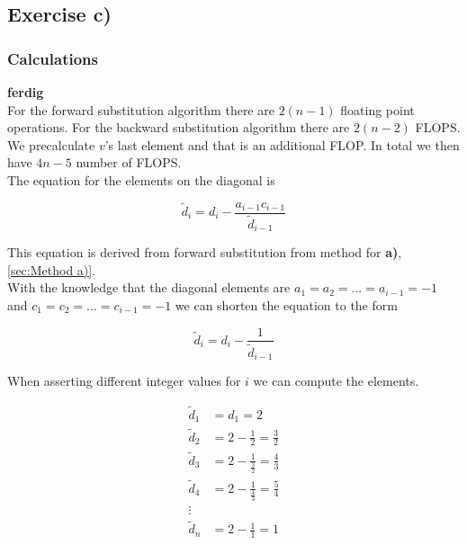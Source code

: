 \documentclass{article}
\begin{document}
\subsection{Exercise c)} \label{sec:Method c)}

  \subsubsection{Calculations}

    {\bf ferdig} \\

    For the forward substitution algorithm there are $2(n-1)$ floating point operations. For the backward substitution algorithm there are $2(n-2)$ FLOPS. We precalculate $v$'s last element and that is an additional FLOP. In total we then have $4n - 5$ number of FLOPS. \\

    The equation for the elements on the diagonal is

    \begin{equation*}
      \tilde{d}_i = d_i - \frac{a_{i-1} c_{i-1}}{\tilde{d}_{i-1}}
    \end{equation*}

    This equation is derived from forward substitution from method for \textbf{a)}, \ref{sec:Method a)}. \\

    With the knowledge that the diagonal elements are $a_1 = a_2 = ... = a_{i-1} = -1 $ and $c_1 = c_2 = ... = c_{i-1} = -1$ we can shorten the equation to the form

    \begin{equation*}
      \tilde{d}_i = d_i - \frac{1}{\tilde{d}_{i-1}}
    \end{equation*}

    When asserting different integer values for $i$ we can compute the elements.

    \begin{align*}
      \tilde{d}_1 &= d_1 = 2 \\
      \tilde{d}_2 &= 2 - \frac{1}{2} = \frac{3}{2} \\
      \tilde{d}_3 &= 2 - \frac{1}{\frac{3}{2}} = \frac{4}{3} \\
      \tilde{d}_4 &= 2 - \frac{1}{\frac{4}{3}} = \frac{5}{4} \\
      \vdots \\
      \tilde{d}_n &= 2 - \frac{1}{1} = 1 \\
    \end{align*}
\end{document}

